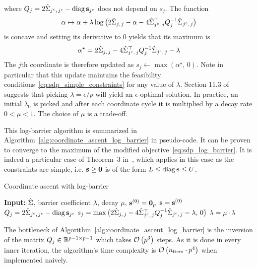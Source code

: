 where $Q_j = 2\hat{\Sigma}_{j^c,\, j^c} - \operatorname*{diag}\mathbf{s}_{j^c}$ does not depend on $s_j$.
The function
\begin{equation*}
    \alpha \mapsto \alpha
        + \lambda\log\big( 2\hat{\Sigma}_{j,\, j} - \alpha - 4\hat{\Sigma}_{j^c,\, j}^\top Q_j^{-1} \hat{\Sigma}_{j^c,\, j} \big)
\end{equation*}
is concave and setting its derivative to $0$ yields that its maximum is
\begin{equation*}
    \alpha^\star = 2\hat{\Sigma}_{j,\, j} - 4\hat{\Sigma}_{j^c,\, j}^\top Q_j^{-1} \hat{\Sigma}_{j^c,\, j} - \lambda
\end{equation*}
The $j$th coordinate is therefore updated as $s_j \leftarrow \max\left( \alpha^\star,\, 0 \right)$.
Note in particular that this update maintains the feasibility
conditions~\ref{eq:sdp_simple_constraints} for any value of $\lambda$.
Section 11.3 of~\cite{convex_optimization} suggests that picking $\lambda = \epsilon / p$ will yield an
$\epsilon$-optimal solution.
In practice, an initial $\lambda_0$ is picked and after each coordinate cycle it is multiplied by a decay rate
$0 < \mu < 1$.
The choice of $\mu$ is a trade-off.

This log-barrier algorithm is summarized in Algorithm~\ref{alg:coordinate_ascent_log_barrier} in pseudo-code.
It can be proven to converge to the maximum
of the modified objective~\ref{eq:sdp_log_barrier}.
It is indeed a particular case of Theorem~3 in~\cite{block_coordinate_sdp},
which applies in this case as the constraints are simple,
i.e. $\mathbf{s} \geq \mathbf{0}$ is of the form $L \leq \operatorname*{diag}\mathbf{s} \leq U$.
\begin{algorithm}[t]
    \caption{Coordinate ascent with log-barrier}\label{alg:coordinate_ascent_log_barrier}
    \begin{algorithmic}[1]
        \State \textbf{Input:} $\hat{\Sigma}$, barrier coefficient $\lambda$, decay $\mu$, $\mathbf{s}^{(0)} = \mathbf{0}_p$
        \State $\mathbf{s} = \mathbf{s}^{(0)}$
        \Repeat
        \State $Q_j = 2\hat{\Sigma}_{j^c,\, j^c} - \operatorname*{diag}\mathbf{s}_{j^c}$
        \State $s_j = \max\big( 2\hat{\Sigma}_{j,\, j} - 4\hat{\Sigma}_{j^c,\, j}^\top Q_j^{-1} \hat{\Sigma}_{j^c,\, j} - \lambda,\, 0 \big)$
        \EndFor
        \State $\lambda = \mu \cdot \lambda$
    \end{algorithmic}
\end{algorithm}

The bottleneck of Algorithm~\ref{alg:coordinate_ascent_log_barrier} is the inversion of the matrix
$Q_j \in \mathbb{R}^{p - 1 \times p - 1}$ which takes $\mathcal{O}\left( p^3 \right)$ steps.
As it is done in every inner iteration, the algorithm's time complexity is
$\mathcal{O}\left( n_\text{iters} \cdot p^4 \right)$ when implemented naively.

